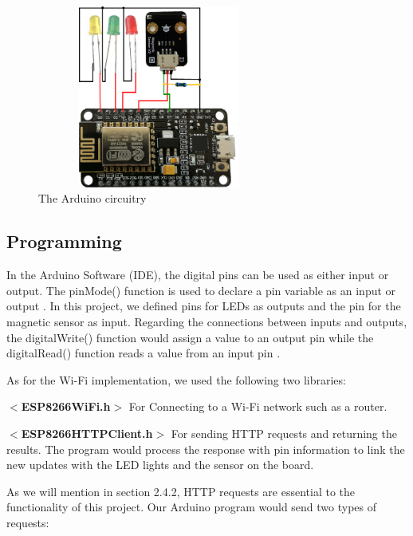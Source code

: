 \documentclass[12pt,a4paper]{report}
\begin{document}
\begin{figure}[H]
	\centering
	\includegraphics[height=6cm, width=8cm]{figures/circuit.png}
	\caption{The Arduino circuitry}
\end{figure}




\subsection{Programming}
In the Arduino Software (IDE), the digital pins can be used as either input or output. The pinMode() function is used to declare a pin variable as an input or output \cite{arduino2}. In this project, we defined pins for LEDs as outputs and the pin for the magnetic sensor as input. Regarding the connections between inputs and outputs, the digitalWrite() function would assign a value to an output pin while the digitalRead() function reads a value from an input pin \cite{arduino2}.

\vspace{0.1cm}

\noindent As for the Wi-Fi implementation, we used the following two libraries: 


\vspace{0.2cm}
\noindent \textbf{$<$ESP8266WiFi.h$>$} For Connecting to a Wi-Fi network such as a router. 

\vspace{0.2cm}

\noindent \textbf{$<$ESP8266HTTPClient.h$>$} For sending HTTP requests and returning the results. The program would process the response with pin information to link the new updates with the LED lights and the sensor on the board. 

\vspace{0.2cm}
\noindent As we will mention in section 2.4.2, HTTP requests are essential to the functionality of this project. Our Arduino program would send two types of requests:
\end{document}
